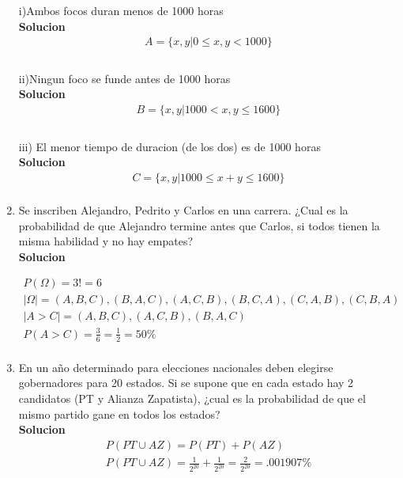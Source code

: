 \begin{enumerate}
    i)Ambos focos duran menos de 1000 horas     \\
    \textbf{Solucion}\\
    \begin{gather*}
    A = \lbrace x,y | 0\leq x,y <1000\rbrace \\
    \end{gather*}\\
    ii)Ningun foco se funde antes de 1000 horas 
    \\\textbf{Solucion}\\
    \begin{gather*}
    B = \lbrace x,y | 1000 < x,y \leq 1600\rbrace \\
    \end{gather*}\\
    iii) El menor tiempo de duracion (de los dos) es de 1000 horas
    \\\textbf{Solucion}\\
    \begin{gather*}
    C = \lbrace x,y | 1000 \leq x+y \leq 1600\rbrace \\
    \end{gather*}
    
    \item Se inscriben Alejandro, Pedrito y Carlos en una carrera. ¿Cual es la probabilidad de que Alejandro termine antes que Carlos, si todos tienen la misma habilidad y no hay empates? 
    \\\textbf{Solucion}
    
    \begin{gather*}
    P(\Omega) = 3! = 6\\
    |\Omega| = {(A,B,C), (B,A,C), (A,C,B), (B,C,A), (C,A,B), (C,B,A)}\\
    |A>C| = {(A,B,C), (A,C,B), (B,A,C)}\\
    P(A>C) = \frac{3}{6} =  \frac{1}{2} = 50\% \\        
    \end{gather*}
    
    \item En un año determinado para elecciones nacionales deben elegirse gobernadores para 20 estados. Si se supone que en cada estado hay 2 candidatos (PT y Alianza Zapatista), ¿cual es la probabilidad de que el mismo partido gane en todos los estados?
    \\\textbf{Solucion}\\
    \begin{gather*}
    P(PT \cup AZ)= P(PT) + P(AZ)\\
    P(PT \cup AZ)= \frac{1}{2^{20}} + \frac{1}{2^{20}} = \frac{2}{2^{20}} = .001907\%\\
    \end{gather*}
    

\end{enumerate}
